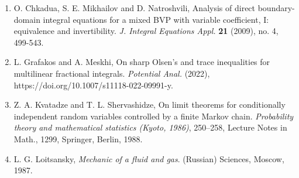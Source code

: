 \documentclass[11pt]{book}
\begin{document}
\begin{enumerate}

\item[{[1]}] O. Chkadua,  S. E. Mikhailov and D. Natroshvili, Analysis of direct boundary-domain integral equations for a mixed  BVP with variable coefficient, I: equivalence and invertibility. \emph{J. Integral Equations Appl.} \textbf{21} (2009), no. 4, 499-543.

\vspace{-5pt}
\item[{[2]}] L. Grafakos and A. Meskhi,   On sharp Olsen’s and trace inequalities for multilinear fractional integrals. \emph{Potential Anal.} (2022),
https://doi.org/10.1007/s11118-022-09991-y.


\vspace{-5pt}
\item[{[3]}] Z. A. Kvatadze and T. L. Shervashidze, On limit theorems for conditionally independent random variables controlled by a finite Markov chain. \emph{Probability theory and mathematical statistics (Kyoto, 1986)}, 250--258, Lecture Notes in Math., 1299, Springer, Berlin, 1988.


\vspace{-5pt}
\item[{[4]}] L. G. Loitsansky, \textit{Mechanic of a fluid and gas}. (Russian) Sciences, Moscow, 1987.
\end{enumerate}
\end{document}
